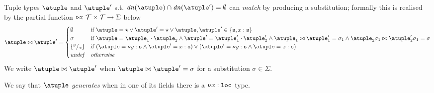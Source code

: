 Tuple types $\atuple$ and $\atuple'$ s.t.
$\dn{\atuple}\cap\dn{\atuple'} = \emptyset$
can \emph{match} by producing a substitution; formally
this is realised by the partial function
$\matches : \tupleset \times \tupleset \to \Sigma$ below
\[
  \atuple \matches \atuple' \generates
    \begin{cases}
     \emptyset
    & 
    \text{if  } \atuple = \wildcard \vee \atuple' = \wildcard  \vee 
    \atuple,\atuple'\in\{\asort, x : \asort\}
    \\
    \sigma
    &
    \text{if } \atuple = \atuple_1 \cdot \atuple_2
    \land  \atuple' = \atuple'_1 \cdot \atuple'_2
    \land \atuple_1 \matches \atuple'_1 \generates \sigma_1
    \land \atuple_2\sigma_1 \matches \atuple'_2\sigma_1 \generates \sigma
    \\
    \sust x y 
    &
    \text{if  } (\atuple = \nu y : \asort \land \atuple' = x: \asort) \vee  (\atuple' = \nu y : \asort \land \atuple = x: \asort) 
    \\
    \textit{undef} & \textit{otherwise}
   \end{cases}
\]
%
We write $\atuple \matches \atuple'$ when
$\atuple \matches \atuple' = \sigma$ for a substitution
$\sigma \in \Sigma$.
%
%
%

\noindent
We say that $\atuple$ \emph{generates} when in one of its fields there
is a $\nu x: \asort[loc]$ type. 
%

%


